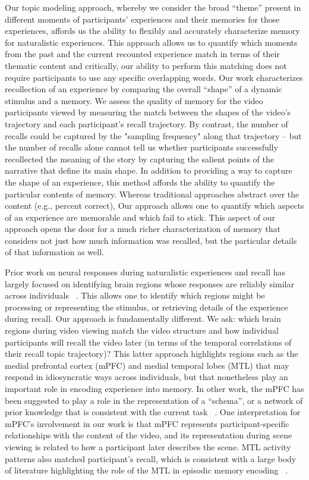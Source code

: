 \documentclass{article}
\begin{document}
Our topic modeling approach, whereby we consider the broad ``theme'' present in different moments of participants' experiences and their memories for those experiences, affords us the ability to flexibly and accurately characterize memory for naturalistic experiences. This approach allows us to quantify which moments from the past and the current recounted experience match in terms of their thematic content and critically, our ability to perform this matching does not require participants to use any specific overlapping words. Our work characterizes recollection of an experience by comparing the overall ``shape'' of a dynamic stimulus and a memory. We assess the quality of memory for the video participants viewed by measuring the match between the shapes of the video's trajectory and each participant's recall trajectory. By contrast, the number of recalls could be captured by the "sampling frequency" along that trajectory -- but the number of recalls alone cannot tell us whether participants successfully recollected the meaning of the story by capturing the salient points of the narrative that define its main shape. In addition to providing a way to capture the shape of an experience, this method affords the ability to quantify the particular contents of memory.  Whereas traditional approaches abstract over the content (e.g., percent correct), Our approach allows one to quantify which aspects of an experience are memorable and which fail to stick. This aspect of our approach opens the door for a much richer characterization of memory that considers not just how much information was recalled, but the particular details of that information as well.

Prior work on neural responses during naturalistic experiences and recall has largely focused on identifying brain regions whose responses are reliably similar across individuals ~\citep{LernEtal11, SimoEtal16, ChenEtal17, BaldEtal17, ZadbEtal17}. This allows one to identify which regions might be processing or representing the stimulus, or retrieving details of the experience during recall. Our approach is fundamentally different. We ask: which brain regions during video viewing match the video structure and how individual participants will recall the video later (in terms of the temporal correlations of their recall topic trajectory)? This latter approach highlights regions such as the medial prefrontal cortex (mPFC) and medial temporal lobes (MTL) that may respond in idiosyncratic ways across individuals, but that nonetheless play an important role in encoding experience into memory. In other work, the mPFC has been suggested to play a role in the representation of a ``schema'', or a network of prior knowledge that is consistent with the current task ~\citep{KestEtal12, GilbMarl17}. One interpretation for mPFC's involvement in our work is that mPFC represents participant-specific relationships with the content of the video, and its representation during scene viewing is related to how a participant later describes the scene. MTL activity patterns also matched participant's recall, which is consistent with a large body of literature highlighting the role of the MTL in episodic memory encoding ~\citep{PallWagn02, DavaEtAl03, RangEtal04, Dava06}.
\end{document}
